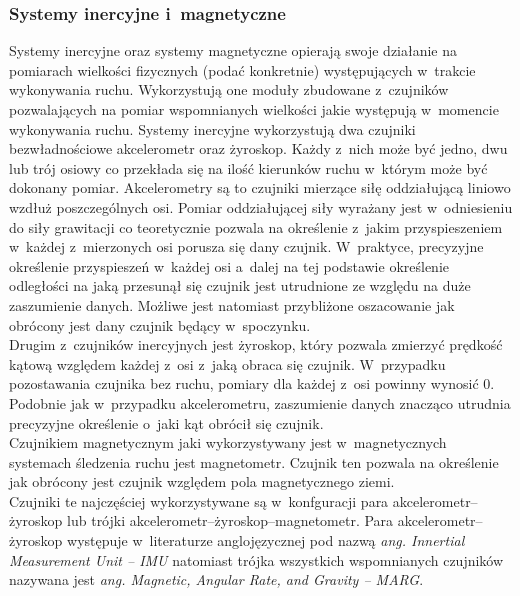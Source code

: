 \subsubsection*{Systemy inercyjne i~magnetyczne}\label{chap:mocaps:IMU}
Systemy inercyjne oraz systemy magnetyczne opierają swoje działanie na pomiarach wielkości fizycznych (podać konkretnie) występujących w~trakcie wykonywania ruchu. Wykorzystują one moduły zbudowane z~czujników pozwalających na pomiar wspomnianych wielkości jakie występują w~momencie wykonywania ruchu. Systemy inercyjne wykorzystują dwa czujniki bezwładnościowe akcelerometr oraz żyroskop. Każdy z~nich może być jedno, dwu lub trój osiowy co przekłada się na ilość kierunków ruchu w~którym może być dokonany pomiar. Akcelerometry są to czujniki mierzące siłę oddziałującą liniowo wzdłuż poszczególnych osi. Pomiar oddziałującej siły wyrażany jest w~odniesieniu do siły grawitacji co teoretycznie pozwala na określenie z~jakim przyspieszeniem w~każdej z~mierzonych osi porusza się dany czujnik. W~praktyce, precyzyjne określenie przyspieszeń w~każdej osi a~dalej na tej podstawie określenie odległości na jaką przesunął się czujnik jest utrudnione ze względu na duże zaszumienie danych. Możliwe jest natomiast przybliżone oszacowanie jak obrócony jest dany czujnik będący w~spoczynku.\\
Drugim z~czujników inercyjnych jest żyroskop, który pozwala zmierzyć prędkość kątową względem każdej z~osi z~jaką obraca się czujnik. W~przypadku pozostawania czujnika bez ruchu, pomiary dla każdej z~osi powinny wynosić 0. Podobnie jak w~przypadku akcelerometru, zaszumienie danych znacząco utrudnia precyzyjne określenie o~jaki kąt obrócił się czujnik.\\
Czujnikiem magnetycznym jaki wykorzystywany jest w~magnetycznych systemach śledzenia ruchu jest magnetometr. Czujnik ten pozwala na określenie jak obrócony jest czujnik względem pola magnetycznego ziemi.\\
Czujniki te najczęściej wykorzystywane są w~konfguracji para akcelerometr--żyroskop lub trójki akcelerometr--żyroskop--magnetometr. Para akcelerometr--żyroskop występuje w~literaturze anglojęzycznej pod nazwą \emph{ang. Innertial Measurement Unit -- IMU} natomiast trójka wszystkich wspomnianych czujników nazywana jest \emph{ang. Magnetic, Angular Rate, and Gravity -- MARG}.\\
